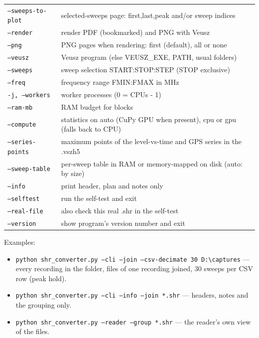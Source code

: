 \documentclass[11pt,a4paper]{article}
\newcommand{\code}[1]{\texttt{#1}}
\begin{document}
\begin{longtable}{p{4.6cm}p{11cm}}
\texttt{--sweeps-to-plot} & selected-sweeps page: first,last,peak and/or sweep indices\\
\texttt{--render} & render PDF (bookmarked) and PNG with Veusz\\
\texttt{--png} & PNG pages when rendering: first (default), all or none\\
\texttt{--veusz} & Veusz program (else VEUSZ\_EXE, PATH, usual folders)\\
\texttt{--sweeps} & sweep selection START:STOP:STEP (STOP exclusive)\\
\texttt{--freq} & frequency range FMIN:FMAX in MHz\\
\texttt{-j, --workers} & worker processes (0 = CPUs - 1)\\
\texttt{--ram-mb} & RAM budget for blocks\\
\texttt{--compute} & statistics on auto (CuPy GPU when present), cpu or gpu (falls back to CPU)\\
\texttt{--series-points} & maximum points of the level-vs-time and GPS series in the .vszh5\\
\texttt{--sweep-table} & per-sweep table in RAM or memory-mapped on disk (auto: by size)\\
\texttt{--info} & print header, plan and notes only\\
\texttt{--selftest} & run the self-test and exit\\
\texttt{--real-file} & also check this real .shr in the self-test\\
\texttt{--version} & show program's version number and exit\\
\bottomrule
\end{longtable}
Examples:
\begin{itemize}[nosep]
\item \code{python shr\_converter.py --cli --join --csv-decimate 30 D:\textbackslash{}captures} --- every
      recording in the folder, files of one recording joined, 30 sweeps per CSV row (peak hold).
\item \code{python shr\_converter.py --cli --info --join *.shr} --- headers, notes and the grouping only.
\item \code{python shr\_converter.py --reader --group *.shr} --- the reader's own view of the files.
\end{itemize}
\end{document}
